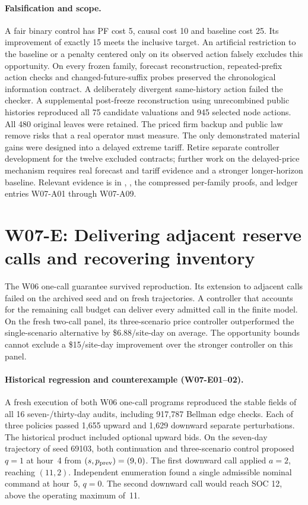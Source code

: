 \documentclass[11pt,letterpaper]{article}
\begin{document}
\paragraph{Falsification and scope.}
A fair binary control has PF cost 5, causal cost 10 and baseline cost 25. Its improvement of exactly 15 meets the inclusive target. An artificial restriction to the baseline or a penalty centered only on its observed action falsely excludes this opportunity. On every frozen family, forecast reconstruction, repeated-prefix action checks and changed-future-suffix probes preserved the chronological information contract. A deliberately divergent same-history action failed the checker. A supplemental post-freeze reconstruction using unrecombined public histories reproduced all 75 candidate valuations and 945 selected node actions. All 480 original leaves were retained. The priced firm backup and public law remove risks that a real operator must measure. The only demonstrated material gains were designed into a delayed extreme tariff. Retire separate controller development for the twelve excluded contracts; further work on the delayed-price mechanism requires real forecast and tariff evidence and a stronger longer-horizon baseline. Relevant evidence is in , , the compressed per-family proofs,  and ledger entries W07-A01 through W07-A09.
\section{W07-E: Delivering adjacent reserve calls and recovering inventory}
\label{sec:w07e}
The W06 one-call guarantee survived reproduction. Its extension to adjacent calls failed on the archived seed and on fresh trajectories. A controller that accounts for the remaining call budget can deliver every admitted call in the finite model. On the fresh two-call panel, its three-scenario price controller outperformed the single-scenario alternative by \$6.88/site-day on average. The opportunity bounds cannot exclude a \$15/site-day improvement over the stronger controller on this panel.

\paragraph{Historical regression and counterexample (W07-E01--02).}
A fresh execution of both W06 one-call programs reproduced the stable fields of all 16 seven-/thirty-day audits, including 917,787 Bellman edge checks. Each of three policies passed 1,655 upward and 1,629 downward separate perturbations. The historical product included optional upward bids. On the seven-day trajectory of seed 69103, both continuation and three-scenario control proposed $q=1$ at hour~4 from $(s,p_{\rm prev})=(9,0)$. The first downward call applied $a=2$, reaching $(11,2)$. Independent enumeration found a single admissible nominal command at hour~5, $q=0$. The second downward call would reach SOC 12, above the operating maximum of~11.
\end{document}
